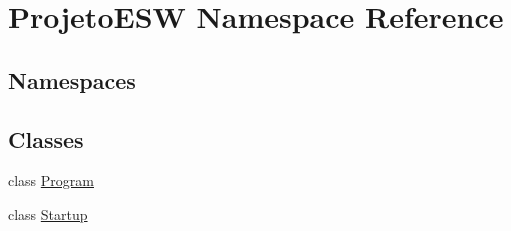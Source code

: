 \hypertarget{namespace_projeto_e_s_w}{}\section{Projeto\+E\+SW Namespace Reference}
\label{namespace_projeto_e_s_w}
\subsection*{Namespaces}
\begin{DoxyCompactItemize}
\end{DoxyCompactItemize}
\subsection*{Classes}
\begin{DoxyCompactItemize}
\item 
class \mbox{\hyperlink{class_projeto_e_s_w_1_1_program}{Program}}
\item 
class \mbox{\hyperlink{class_projeto_e_s_w_1_1_startup}{Startup}}
\end{DoxyCompactItemize}
